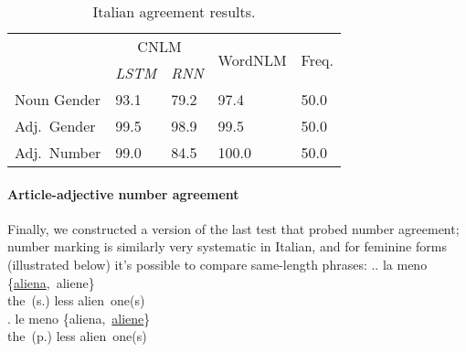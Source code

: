 \begin{table}[t]
  \begin{small}
    \begin{center}
      \begin{tabular}{l|ll|l|l}
        & \multicolumn{2}{c|}{CNLM} & \multicolumn{1}{c|}{\multirow{2}{*}{WordNLM}}  & \multicolumn{1}{c}{\multirow{2}{*}{Freq.}}\\
        &\emph{LSTM}&\emph{RNN} &  \\ \hline
        Noun Gender & 93.1  & 79.2 & 97.4 & 50.0\\
        Adj.~Gender & 99.5 & 98.9 & 99.5 & 50.0\\
        Adj.~Number & 99.0 & 84.5 & 100.0 & 50.0 \\
%
      \end{tabular}
    \end{center}
  \end{small}
  \caption{\label{tab:ital-agr-results} Italian agreement results.} %
\end{table}

\paragraph{Article-adjective number agreement}
Finally, we constructed a version of the last test that probed number agreement; number marking is similarly very systematic in Italian, and for feminine forms (illustrated below) it's possible to compare same-length phrases:
\ex.\ag. la meno \{\underline{aliena},\ aliene\} \\
the\ (s.) less alien\ one(s) \\
\bg. le meno \{aliena,\ \underline{aliene}\} \\
the\ (p.) less alien\ one(s) \\

